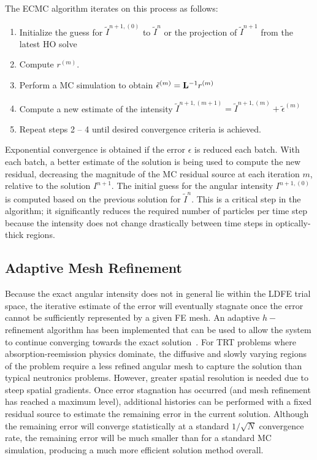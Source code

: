 The ECMC algorithm iterates on this process as follows:
\begin{enumerate}
    \item Initialize the guess for $\tilde{I}^{n+1,(0)}$ to $\tilde{I}^{n}$ or the
        projection of $\tilde{I}^{n+1}$ from the latest HO solve
\item Compute $r^{(m)}$.
\item Perform a MC simulation to obtain $\tilde{\epsilon}^{(m)} = \mathbf{L}^{-1} r^{(m)}$
\item Compute a new estimate of the intensity $\tilde I^{n+1,(m+1)} = \tilde I^{n+1,(m)}
+ \tilde\epsilon^{(m)}$
\item Repeat steps 2 -- 4 until desired convergence criteria is achieved. 
\end{enumerate}
Exponential convergence is obtained if the error $\epsilon$ is reduced each batch.  With each batch, a
better estimate of the solution is being used to compute the new residual, decreasing
the magnitude of the MC residual source at each iteration $m$, relative to the solution
$I^{n+1}$.
The initial guess for the angular intensity $I^{n+1,(0)}$ is computed based on the previous solution
for $\tilde{I}^{n}$. This is a critical step in the algorithm; it significantly reduces the required number of
particles per time step because the intensity does not change drastically between time steps in
optically-thick regions.  

\subsection{Adaptive Mesh Refinement}

Because the exact angular intensity does not in general lie within the LDFE trial space, the
iterative estimate of the error will eventually stagnate once the error cannot be sufficiently
represented by a given FE mesh.  An adaptive $h-$refinement algorithm has been
implemented that can be used to allow the system to continue converging towards the
exact solution~\cite{jake,ans_2014}. For TRT problems where absorption-reemission physics dominate, the diffusive and slowly varying
regions of the problem require a less refined angular mesh to capture the solution than typical neutronics
problems.  However, greater spatial resolution is needed due to steep spatial
gradients.   
Once error stagnation has occurred (and mesh refinement has reached a maximum level),
additional histories can be performed with a
fixed residual source to estimate the remaining error in the current solution.  Although the remaining error will
converge statistically at a standard $1/\sqrt{N}$ convergence rate, the remaining
error will be much smaller than for a standard MC simulation, producing a much more
efficient solution method overall.

